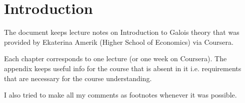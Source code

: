 \chapter*{Introduction}

The document keeps lecture notes on Introduction to Galois theory that
was provided by Ekaterina Amerik (Higher School of Economics) via
Coursera.

Each chapter corresponds to one lecture (or one week on Coursera). The
appendix keeps useful info for the course that is absent in it
i.e. requirements that are necessary for the course understanding.

I also tried to make all my comments as footnotes whenever it was
possible. 

